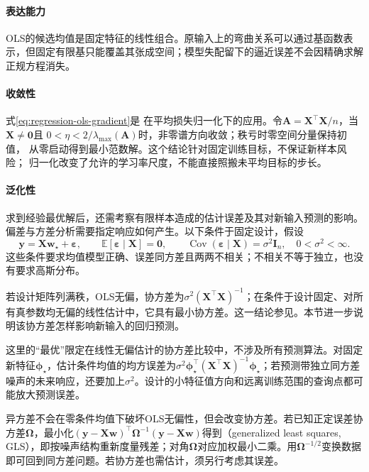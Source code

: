 \paragraph{表达能力}
OLS的候选均值是固定特征的线性组合。原输入上的弯曲关系可以通过基函数表示，但固定有限基只能覆盖其张成空间；模型失配留下的逼近误差不会因精确求解正规方程消失。

\paragraph{收敛性}
式\eqref{eq:regression-ols-gradient}是
在平均损失归一化下的应用。令$\bm A=\bm X^\top\bm X/n$，当$\bm X\ne\bm0$且
$0<\eta<2/\lambda_{\max}(\bm A)$时，非零谱方向收敛；秩亏时零空间分量保持初值，
从零启动得到最小范数解。这个结论针对固定训练目标，不保证新样本风险；
归一化改变了允许的学习率尺度，不能直接照搬未平均目标的步长。

\paragraph{泛化性}
求到经验最优解后，还需考察有限样本造成的估计误差及其对新输入预测的影响。偏差与方差分析需要指定响应如何产生。以下条件于固定设计，假设
\begin{equation}
  \bm{y}=\bm{X}\bm{w}_{\star}+\bm{\varepsilon},\qquad
  \mathbb{E}[\bm{\varepsilon}\mid\bm{X}]=\bm{0},\qquad
  \operatorname{Cov}(\bm{\varepsilon}\mid\bm{X})=\sigma^2\bm{I}_n,
  \quad 0<\sigma^2<\infty.
  \label{eq:regression-gauss-markov-model}
\end{equation}
这些条件要求均值模型正确、误差同方差且两两不相关；不相关不等于独立，也没有要求高斯分布。

若设计矩阵列满秩，OLS无偏，协方差为$\sigma^2(\bm X^\top\bm X)^{-1}$；在条件于设计固定、对所有真参数均无偏的线性估计中，它具有最小协方差。这一结论参见。本节进一步说明该协方差怎样影响新输入的回归预测。

这里的“最优”限定在线性无偏估计的协方差比较中，不涉及所有预测算法。对固定新特征$\bm{\phi}_{\star}$，估计条件均值的均方误差为$\sigma^2\bm{\phi}_{\star}^{\top}(\bm{X}^{\top}\bm{X})^{-1}\bm{\phi}_{\star}$；若预测带独立同方差噪声的未来响应，还要加上$\sigma^2$。设计的小特征值方向和远离训练范围的查询点都可能放大预测误差。

异方差不会在零条件均值下破坏OLS无偏性，但会改变协方差。若已知正定误差协方差$\bm{\Omega}$，最小化$(\bm{y}-\bm{X}\bm{w})^{\top}\bm{\Omega}^{-1}(\bm{y}-\bm{X}\bm{w})$得到（generalized least squares, GLS），即按噪声结构重新度量残差；对角$\bm{\Omega}$对应加权最小二乘。用$\bm{\Omega}^{-1/2}$变换数据即可回到同方差问题。若协方差也需估计，须另行考虑其误差。

